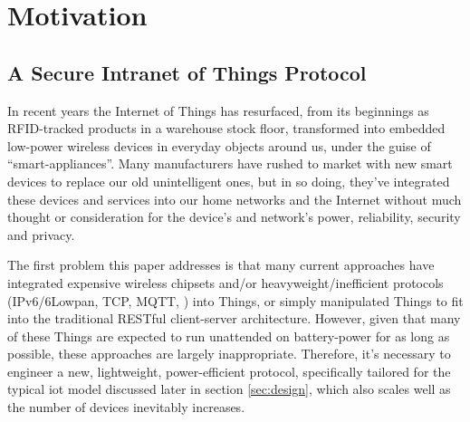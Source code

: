\documentclass{mpaper}
\begin{document}

\section{Motivation} %
\label{sec:motivation}
\subsection{A Secure Intranet of Things Protocol} %
\label{sub:intranet_of_things_protocol}
In recent years the Internet of Things has resurfaced, from its beginnings as RFID-tracked products in a warehouse stock floor, transformed into embedded low-power wireless devices in everyday objects around us, under the guise of ``smart-appliances''. Many manufacturers have rushed to market with new smart devices to replace our old unintelligent ones, but in so doing, they've integrated these devices and services into our home networks and the Internet without much thought or consideration for the device's and network's power, reliability, security and privacy. 

The first problem this paper addresses is that many current approaches have integrated expensive wireless chipsets and/or heavyweight/inefficient protocols (IPv6/6Lowpan, TCP, MQTT\cite{MQTT}, \cite{xAP}) into Things, or simply manipulated Things to fit into the traditional RESTful client-server architecture\cite{IETF_COAP_HTTP}. However, given that many of these Things are expected to run unattended on battery-power for as long as possible, these approaches are largely inappropriate. Therefore, it's necessary to engineer a new, lightweight, power-efficient protocol, specifically tailored for the typical iot model discussed later in section \ref{sec:design}, which also scales well as the number of devices inevitably increases. 
\end{document}
